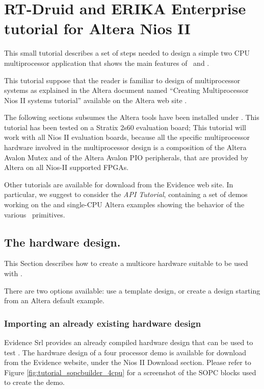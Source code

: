\chapter{RT-Druid and ERIKA Enterprise tutorial for Altera Nios II}

This small tutorial describes a set of steps needed to design a simple
two CPU multiprocessor application that shows the main features of
\ee\ and \rtd.

This tutorial suppose that the reader is familiar to design of
multiprocessor systems as explained in the Altera document named
{}``Creating Multiprocessor Nios II systems tutorial'' available on
the Altera web site \cite{Altera-multicpu-tutorial}.

The following sections subsumes the Altera tools have been installed
under . This tutorial has been tested on a Stratix
2s60 evaluation board; This tutorial will work with all Nios II
evaluation boards, because all the specific multiprocessor hardware
involved in the multiprocessor design is a composition of the Altera
Avalon Mutex and of the Altera Avalon PIO peripherals, that are
provided by Altera on all Nios-II supported FPGAs.

Other tutorials are available for download from the Evidence web
site. In particular, we suggest to consider the {\em API Tutorial},
containing a set of demos working on the
 and  single-CPU Altera examples
showing the behavior of the various \ee\ primitives.


\section{The hardware design.}

This Section describes how to create a multicore hardware suitable to
be used with \ee.

There are two options available: use a template design, or
create a design starting from an Altera default example.

\subsection{Importing an already existing hardware design}
Evidence Srl provides an already compiled hardware design that can be
used to test \ee. The hardware design of a four processor demo is
available for download from the Evidence website, under the Nios II
Download section. Please refer to Figure
\ref{fig:tutorial_sopcbuilder_4cpu} for a screenshot of the SOPC
blocks used to create the demo.

